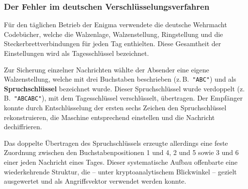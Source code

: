 \documentclass[12pt, ngerman, a4paper, numbers=noenddot]{article}
\begin{document}
\subsubsection{Der Fehler im deutschen Verschlüsselungsverfahren}

Für den täglichen Betrieb der Enigma verwendete die deutsche Wehrmacht Codebücher, welche die Walzenlage, Walzenstellung, Ringstellung und die Steckerbrettverbindungen für jeden Tag enthielten. Diese Gesamtheit der Einstellungen wird als Tagesschlüssel bezeichnet. 



Zur Sicherung einzelner Nachrichten wählte der Absender eine eigene Walzenstellung, welche mit drei Buchstaben beschrieben (z.\,B.\ \lstinline|"ABC"|) und als \textbf{Spruchschlüssel} bezeichnet wurde. Dieser Spruchschlüssel wurde verdoppelt (z.\,B.\ \lstinline|"ABCABC"|), mit dem Tagesschlüssel verschlüsselt, übertragen. Der Empfänger konnte durch Entschlüsselung der ersten sechs Zeichen den Spruchschlüssel rekonstruieren, die Maschine entsprechend einstellen und die Nachricht dechiffrieren.

Das doppelte Übertragen des Spruchschlüssels erzeugte allerdings eine feste Zuordnung zwischen den Buchstabenpositionen 1 und 4, 2 und 5 sowie 3 und 6 einer jeden Nachricht eines Tages. Dieser systematische Aufbau offenbarte eine wiederkehrende Struktur, die – unter kryptoanalytischem Blickwinkel – gezielt ausgewertet und als Angriffsvektor verwendet werden konnte.
\end{document}
